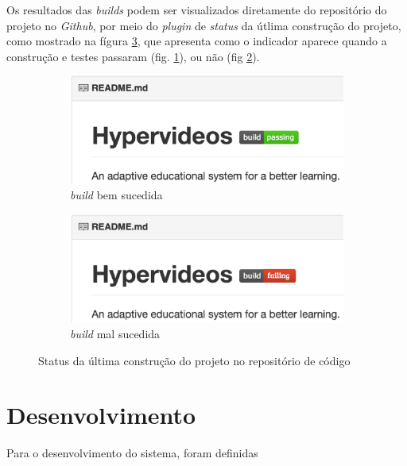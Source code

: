 Os resultados das \textit{builds} podem ser visualizados diretamente do repositório do projeto no \textit{Github}, por meio do \textit{plugin} de \textit{status} da útlima construção do projeto, como mostrado na fígura \ref{fig:status}, que apresenta como o indicador aparece quando a construção e testes passaram (fig. \ref{fig:status_a}), ou não (fig \ref{fig:status_b}).

\begin{figure}[h!]
  	\centering
  	\begin{subfigure}{.4\textwidth}
  		\centering
  		\includegraphics[width=.9\linewidth]{figuras/build_passing.eps}
  		\caption{\textit{build} bem sucedida}
  		\label{fig:status_a}
	\end{subfigure}%
	\begin{subfigure}{.4\textwidth}
  		\centering
  		\includegraphics[width=.9\linewidth]{figuras/build_failure.eps}
		\caption{\textit{build} mal sucedida}
  		\label{fig:status_b}
	\end{subfigure}%
  	\caption{Status da última construção do projeto no repositório de código}
  	\label{fig:status}
\end{figure}
 
\section{Desenvolvimento} 

Para o desenvolvimento do sistema, foram definidas 